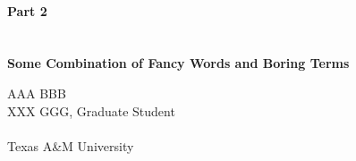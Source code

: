 \documentclass[letterpaper, 12pt, oneside]{book}
\theoremstyle{plain}
\theoremstyle{definition}
\theoremstyle{remark}
\begin{document}


\begin{titlepage}
\centering
\quad \\
\quad \\
\quad \\
\quad \\
\quad \\
\quad \\
\begingroup
    \fontsize{18pt}{20pt}\selectfont
    \textbf{Part 2} \\
    \quad \\
    \quad \\
    \textbf{Some Combination of Fancy Words and Boring Terms}
\endgroup

\vspace{80pt}

\begingroup
\fontsize{16pt}{20pt}\selectfont
AAA BBB\\
XXX GGG, Graduate Student\\
\quad \\
Texas A\&M University    
\endgroup


\end{titlepage}

\newpage




\newpage
\quad \vspace{-1in} %
\tableofcontents

\newpage
\quad \vspace{-1in} %
\listoffigures

\newpage
\quad \vspace{-1in} %
\listoftables
\end{document}
